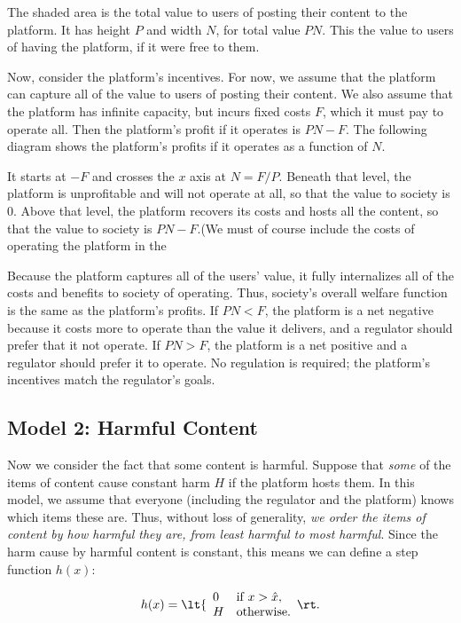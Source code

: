 
The shaded area is the total value to users of posting their content to the platform. It has height $P$ and width $N$, for total value $PN$. This the value to users of having the platform, if it were free to them.

Now, consider the platform's incentives. For now, we assume that the platform can capture all of the value to users of posting their content. We also assume that the platform has infinite capacity, but incurs fixed costs $F$, which it must pay to operate all. Then the platform's profit if it operates is $PN - F$. The following diagram shows the platform's profits if it operates as a function of $N$.


It starts at $-F$ and crosses the $x$ axis at $N = F/P$. Beneath that level, the platform is unprofitable and will not operate at all, so that the value to society is $0$. Above that level, the platform recovers its costs and hosts all the content, so that the value to society is $PN - F $.(We must of course include the costs of operating the platform in the 

Because the platform captures all of the users' value, it fully internalizes all of the costs and benefits to society of operating. Thus, society's overall welfare function is the same as the platform's profits. If $PN < F$, the platform is a net negative because it costs more to operate than the value it delivers, and a regulator should prefer that it not operate. If $PN > F$, the platform is a net positive and a regulator should prefer it to operate. No regulation is required; the platform's incentives match the regulator's goals.

\subsection{Model 2: Harmful Content}
 
Now we consider the fact that some content is harmful. Suppose that \emph{some} of the items of content cause constant harm $H$ if the platform hosts them. In this model, we assume that everyone (including the regulator and the platform) knows which items these are. Thus, without loss of generality, \emph{we order the items of content by how harmful they are, from least harmful to most harmful}. Since the harm cause by harmful content is constant, this means we can define a step function $h(x)$:

\begin{equation}
h(x)=
\lt\{\begin{array}{ll}
    0 & \mbox{if $x>\hat{x}$}, \\
    H & \mbox{otherwise}.
\end{array}\rt.
\end{equation}

